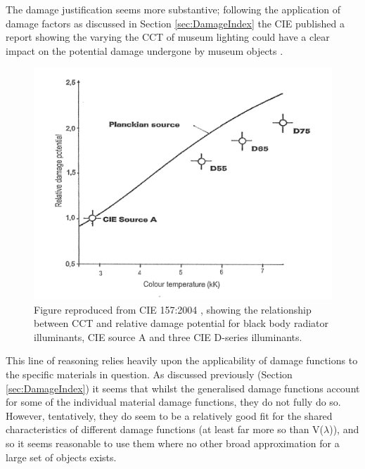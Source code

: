 The damage justification seems more substantive; following the application of damage factors as discussed in Section \ref{sec:DamageIndex} the \gls{CIE} published a report showing the varying the \gls{CCT} of museum lighting could have a clear impact on the potential damage undergone by museum objects \citep{cie_cie_2004}. 

\begin{figure}[hbtp]
\includegraphics[max width=\textwidth]{figs/LitRev/CIE2004.png} 
\caption{Figure reproduced from \gls{CIE} 157:2004 \citep[p.16]{cie_cie_2004}, showing the relationship between \gls{CCT} and relative damage potential for black body radiator illuminants, \gls{CIE} source A and three \gls{CIE} D-series illuminants.}
\label{fig:CIE2004}
\end{figure}

This line of reasoning relies heavily upon the applicability of damage functions to the specific materials in question. As discussed previously (Section \ref{sec:DamageIndex}) it seems that whilst the generalised damage functions account for some of the individual material damage functions, they do not fully do so. However, tentatively, they do seem to be a relatively good fit for the shared characteristics of different damage functions (at least far more so than V($\lambda$)), and so it seems reasonable to use them where no other broad approximation for a large set of objects exists.

